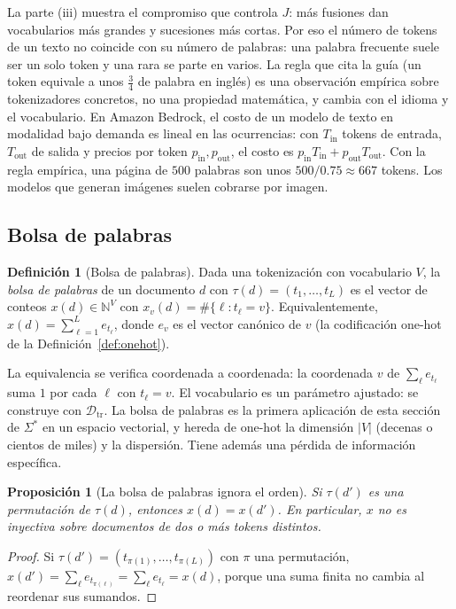 \documentclass[11pt]{article}
\newtheorem{proposicion}[teorema]{Proposición}
\theoremstyle{definition}
\newtheorem{definicion}[teorema]{Definición}
\theoremstyle{remark}
\newcommand{\N}{\mathbb{N}}
\newcommand{\abs}[1]{\left\lvert #1\right\rvert}
\newcommand{\Dtr}{\mathcal{D}_{\mathrm{tr}}}
\begin{document}
\noindent La parte (iii) muestra el compromiso que controla $J$: más fusiones dan vocabularios más grandes y sucesiones más cortas. Por eso el número de tokens de un texto no coincide con su número de palabras: una palabra frecuente suele ser un solo token y una rara se parte en varios. La regla que cita la guía (un token equivale a unos $\frac34$ de palabra en inglés) es una observación empírica sobre tokenizadores concretos, no una propiedad matemática, y cambia con el idioma y el vocabulario. En Amazon Bedrock, el costo de un modelo de texto en modalidad bajo demanda es lineal en las ocurrencias: con $T_{\mathrm{in}}$ tokens de entrada, $T_{\mathrm{out}}$ de salida y precios por token $p_{\mathrm{in}},p_{\mathrm{out}}$, el costo es $p_{\mathrm{in}}T_{\mathrm{in}}+p_{\mathrm{out}}T_{\mathrm{out}}$. Con la regla empírica, una página de $500$ palabras son unos $500/0.75\approx667$ tokens. Los modelos que generan imágenes suelen cobrarse por imagen.

\subsection{Bolsa de palabras}\label{sec:bow}

\begin{definicion}[Bolsa de palabras]\label{def:bow}
\noindent Dada una tokenización con vocabulario $V$, la \emph{bolsa de palabras} de un documento $d$ con $\tau(d)=(t_1,\dots,t_L)$ es el vector de conteos $x(d)\in\N^{V}$ con $x_v(d)=\#\{\ell:t_\ell=v\}$. Equivalentemente, $x(d)=\sum_{\ell=1}^Le_{t_\ell}$, donde $e_v$ es el vector canónico de $v$ (la codificación one-hot de la Definición~\ref{def:onehot}).
\end{definicion}

\noindent La equivalencia se verifica coordenada a coordenada: la coordenada $v$ de $\sum_\ell e_{t_\ell}$ suma $1$ por cada $\ell$ con $t_\ell=v$. El vocabulario es un parámetro ajustado: se construye con $\Dtr$. La bolsa de palabras es la primera aplicación de esta sección de $\Sigma^*$ en un espacio vectorial, y hereda de one-hot la dimensión $\abs V$ (decenas o cientos de miles) y la dispersión. Tiene además una pérdida de información específica.

\begin{proposicion}[La bolsa de palabras ignora el orden]\label{prop:bow-orden}
\noindent Si $\tau(d')$ es una permutación de $\tau(d)$, entonces $x(d)=x(d')$. En particular, $x$ no es inyectiva sobre documentos de dos o más tokens distintos.
\end{proposicion}
\begin{proof}
\noindent Si $\tau(d')=(t_{\pi(1)},\dots,t_{\pi(L)})$ con $\pi$ una permutación, $x(d')=\sum_\ell e_{t_{\pi(\ell)}}=\sum_\ell e_{t_\ell}=x(d)$, porque una suma finita no cambia al reordenar sus sumandos.
\end{proof}
\end{document}
